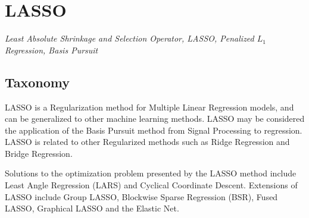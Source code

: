 

\section{LASSO} 
\label{sec:lasso}

\emph{Least Absolute Shrinkage and Selection Operator, LASSO, Penalized $L_1$ Regression, Basis Pursuit}

\subsection{Taxonomy}
LASSO is a Regularization method for Multiple Linear Regression models, and can be generalized to other machine learning methods.
LASSO may be considered the application of the Basis Pursuit method from Signal Processing to regression.
LASSO is related to other Regularized methods such as Ridge Regression and Bridge Regression.

Solutions to the optimization problem presented by the LASSO method include Least Angle Regression (LARS) and Cyclical Coordinate Descent.
Extensions of LASSO include Group LASSO, Blockwise Sparse Regression (BSR), Fused LASSO, Graphical LASSO and the Elastic Net.

